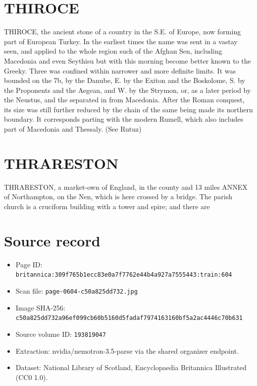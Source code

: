 \documentclass{article}
\begin{document}
\section*{THIROCE}
THIROCE, the ancient stone of a country in the S.E. of Europe, now forming part of European Turkey. In the earliest times the name was sent in a vastay seen, and applied to the whole region such of the Afghan Sen, including Macedonia and even Seythisu but with this morning become better known to the Greeky. Three was confined within narrower and more definite limits. It was bounded on the 7b, by the Danube, E. by the Exiton and the Boskolome, S. by the Proponents and the Aegean, and W. by the Strymon, or, as a later period by the Neustus, and the separated in from Macedonia. After the Roman conquest, its size was still further reduced by the chain of the same being made its northern boundary. It corresponds parting with the modern Rumell, which also includes part of Macedonia and Thessaly. (See Rutuz)

\section*{THRARESTON}
THRARESTON, a market-own of England, in the county and 13 miles ANNEX of Northampton, on the Nen, which is here crossed by a bridge. The parish church is a cruciform building with a tower and spire; and there are

\section*{Source record}
\begin{itemize}
\item Page ID: \texttt{britannica:309f765b1ecc83e0a7f7762e44b4a927a7555443:train:604}
\item Scan file: \texttt{page-0604-c50a825dd732.jpg}
\item Image SHA-256: \texttt{c50a825dd732a96ef099cb60b5160d5fadaf7974163160bf5a2ac4446c70b631}
\item Source volume ID: \texttt{193819047}
\item Extraction: nvidia/nemotron-3.5-parse via the shared organizer endpoint.
\item Dataset: National Library of Scotland, Encyclopaedia Britannica Illustrated (CC0 1.0).
\end{itemize}
\end{document}
